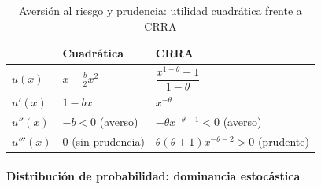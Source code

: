 \documentclass[11pt]{article}
\begin{document}
\begin{table}[H]
\centering
\caption{Aversión al riesgo y prudencia: utilidad cuadrática frente a CRRA}\label{tab:prudencia}
\begin{tabular}{>{\centering\arraybackslash}m{2.6cm}>{\centering\arraybackslash}m{4.4cm}>{\centering\arraybackslash}m{4.8cm}}
\toprule
\rowcolor{tceeazulpalido}
 & \textbf{Cuadrática} & \textbf{CRRA}\\
\midrule
$u(x)$ & $x-\tfrac{b}{2}x^2$ & $\dfrac{x^{1-\theta}-1}{1-\theta}$\\[6pt]
$u'(x)$ & $1-bx$ & $x^{-\theta}$\\[3pt]
$u''(x)$ & $-b<0$ (averso) & $-\theta x^{-\theta-1}<0$ (averso)\\[3pt]
\rowcolor{tceesalvia}
$u'''(x)$ & $0$ (sin prudencia) & $\theta(\theta+1)x^{-\theta-2}>0$ (prudente)\\
\bottomrule
\end{tabular}
\end{table}

\paragraph{Distribución de probabilidad: dominancia estocástica}
\end{document}
